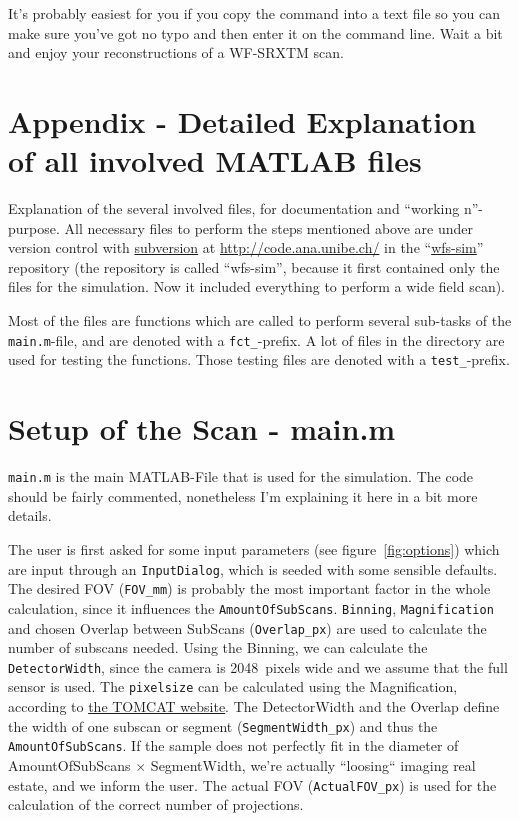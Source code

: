 \documentclass[a4paper]{scrartcl}
\begin{document}
It's probably easiest for you if you copy the command into a text file so you can make sure you've got no typo and then enter it on the command line. Wait a bit and enjoy your reconstructions of a WF-SRXTM scan.




\clearpage

\appendix

\section[Appendix]{Appendix - Detailed Explanation of all involved MATLAB files}
Explanation of the several involved files, for documentation and ``working n''-purpose. All necessary files to perform the steps mentioned above are under version control with  \href{http://en.wikipedia.org/wiki/Subversion_\%28software\%29}{subversion} at \url{http://code.ana.unibe.ch/} in the ``\href{http://code.ana.unibe.ch/websvn/listing.php?repname=wfs-sim&path=\%2F&sc=0}{wfs-sim}'' repository (the repository is called ``wfs-sim'', because it first contained only the files for the simulation. Now it included everything to perform a wide field scan).

Most of the files are functions which are called to perform several sub-tasks of the \verb+main.m+-file, and are denoted with a \verb+fct_+-prefix. A lot of files in the directory are used for testing the functions. Those testing files are denoted with a \verb+test_+-prefix.

\section[Setup of the Scan]{Setup of the Scan - main.m}
\verb+main.m+ is the main MATLAB-File that is used for the simulation. The code should be fairly commented, nonetheless I'm  explaining it here in a bit more details.

The user is first asked for some input parameters (see figure~\ref{fig:options}) which are input through an \verb+InputDialog+, which is seeded with some sensible defaults. The desired FOV (\verb+FOV_mm+) is probably the most important factor in the whole calculation, since it influences the \verb+AmountOfSubScans+. \verb+Binning+, \verb+Magnification+ and chosen Overlap between SubScans (\verb+Overlap_px+) are used to calculate the number of subscans needed. Using the Binning, we can calculate the \verb+DetectorWidth+, since the camera is 2048~pixels wide and we assume that the full sensor is used. The \verb+pixelsize+ can be calculated using the Magnification, according to \href{http://sls.web.psi.ch/view.php/beamlines/tomcat/layout/detectors/index.html}{the TOMCAT website}. The DetectorWidth and the Overlap define the width of one subscan or segment (\verb+SegmentWidth_px+) and thus the \verb+AmountOfSubScans+. If the sample does not perfectly fit in the diameter of AmountOfSubScans $\times$ SegmentWidth, we're actually ``loosing`` imaging real estate, and we inform the user. The actual FOV (\verb+ActualFOV_px+) is used for the calculation of the correct number of projections.
\end{document}
